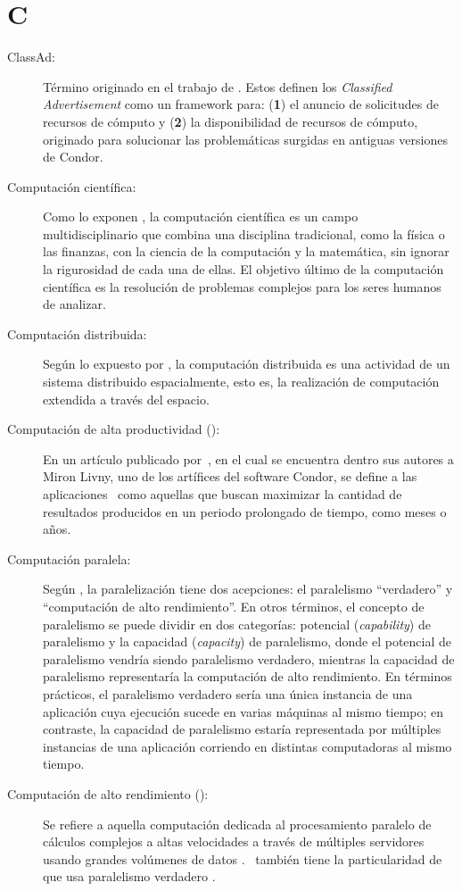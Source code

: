 \section*{C}
\begin{description}
	\item[ClassAd:] Término originado en el trabajo de \cite{Raman1998}. Estos definen los \textit{Classified Advertisement} como un framework para: (\textbf{1}) el anuncio de solicitudes de recursos de cómputo y (\textbf{2}) la disponibilidad de recursos de cómputo, originado para solucionar las problemáticas surgidas en antiguas versiones de Condor.

	\item[Computación científica:] Como lo exponen \cite{Landau2005}, la computación científica es un campo multidisciplinario que combina una disciplina tradicional, como la física o las finanzas, con la ciencia de la computación y la matemática, sin ignorar la rigurosidad de cada una de ellas. El objetivo último de la computación científica es la resolución de problemas complejos para los seres humanos de analizar.

	\item[Computación distribuida:] Según lo expuesto por \cite{Lamport1990}, la computación distribuida es una actividad de un sistema distribuido espacialmente, esto es, la realización de computación extendida a través del espacio.

	\item[Computación de alta productividad (\HTC):] En un artículo publicado por~\cite{Juve2015}, en el cual se encuentra dentro sus autores a Miron Livny, uno de los artífices del software Condor, se define a las aplicaciones \HTC~como aquellas que buscan maximizar la cantidad de resultados producidos en un periodo prolongado de tiempo, como meses o años.

	\item[Computación paralela:] Según \cite{Morgan2009}, la paralelización tiene dos acepciones: el paralelismo ``verdadero'' y ``computación de alto rendimiento''. En otros términos, el concepto de paralelismo se puede dividir en dos categorías: potencial (\textit{capability}) de paralelismo y la capacidad (\textit{capacity}) de paralelismo, donde el potencial de paralelismo vendría siendo paralelismo verdadero, mientras la capacidad de paralelismo representaría la computación de alto rendimiento. En términos prácticos, el paralelismo verdadero sería una única instancia de una aplicación cuya ejecución sucede en varias máquinas al mismo tiempo; en contraste, la capacidad de paralelismo estaría representada por múltiples instancias de una aplicación corriendo en distintas computadoras al mismo tiempo.

	\item[Computación de alto rendimiento (\HPC):] Se refiere a aquella computación dedicada al procesamiento paralelo de cálculos complejos a altas velocidades a través de múltiples servidores usando grandes volúmenes de datos \citep{SK2023}. \HPC~también tiene la particularidad de que usa paralelismo verdadero \citep{Morgan2009}.
\end{description}

